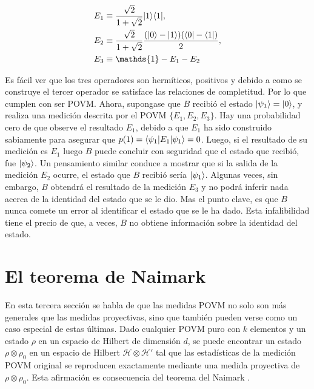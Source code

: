 	\begin{align}
		E_1 & \equiv \dfrac{\sqrt{2}}{1+\sqrt{2}} |1\rala1|, \label{eq11} \\
		E_2 & \equiv \dfrac{\sqrt{2}}{1+\sqrt{2}} \dfrac{(|0\ra -|1\ra)(\la0|-\la1|)}{2}, \label{eq12} \\
		E_3 & \equiv \mathds{1}-E_1-E_2\label{eq13} 
	\end{align}



Es fácil ver que los tres operadores son hermíticos, positivos y debido a como se construye el tercer operador se satisface las relaciones de completitud. Por lo que cumplen con ser POVM\@. Ahora, supongase que $B$ recibió el estado $|\psi_1\rangle=|0\rangle$, y realiza una medición descrita por el POVM $\{E_1,E_2,E_3\}$. Hay una probabilidad cero de que observe el resultado $E_1$, debido a que $E_1$ ha sido construido sabiamente para asegurar que $p(1)=\langle\psi_1|E_1|\psi_1\rangle=0$. Luego, si el resultado de su medición es $E_1$ luego $B$ puede concluir con seguridad que el estado que recibió, fue $|\psi_2\rangle $. Un pensamiento similar conduce a mostrar que si la salida de la medición $E_2$ ocurre, el estado que $B$ recibió sería $|\psi_1\rangle$. Algunas veces, sin embargo, $B$ obtendrá el resultado de la medición $E_3$ y no podrá inferir nada acerca de la identidad del estado que se le dio. Mas el punto clave, es que $B$ nunca comete un error al identificar el estado que se le ha dado. Esta infalibilidad tiene el precio de que, a veces, $B$ no obtiene información sobre la identidad del estado.



\section{El teorema de Naimark}

En esta tercera sección se habla de que las medidas POVM no solo son más generales que las medidas proyectivas, sino que también pueden verse como un caso especial de estas últimas. Dado cualquier POVM puro con $k$ elementos y un estado $\rho$ en un espacio de Hilbert de dimensión $d$, se puede encontrar un estado $\rho \otimes \rho_0$ en un espacio de Hilbert  $\mathcal{H}\otimes\mathcal{H'}$ tal que las estadísticas de la medición POVM original se reproducen exactamente mediante una medida proyectiva de $\rho \otimes \rho_0$. Esta afirmación es consecuencia del teorema del Naimark {\cite{2007geometry}}.




